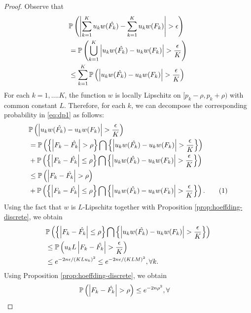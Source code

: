 \begin{proof}
Observe that
\begin{align}
&\mathbb{P}\left( \left| \sum_{k=1}^K u_k w(\hat{F_k}) - \sum_{k=1}^K u_k w(F_k) \right| >\epsilon \right)\nonumber\\
 & = \mathbb{P}\left( 
\bigcup_{k=1}^K \left| u_k w(\hat{F_k}) -u_k w(F_k) \right| > \frac {\epsilon} {K} \right) \nonumber\\ & \leq
    \sum_{k=1}^K \mathbb{P}\left( \left| u_k w(\hat{F_k}) -u_k w(F_k) \right| > \frac {\epsilon} {K} \right)\label{eq:dp1}
\end{align}
For each $k =1,....K$,
the function $w$ is locally Lipschitz on $[{p_k}- \rho, {p_k}+\rho)$ with common constant $L$.
Therefore, for each $k$, we can decompose the corresponding probability in \eqref{eq:dp1} as follows: 
\begin{align*}
& \Prob{\left| u_k w(\hat{F_k}) -u_k w(F_k) \right| > \frac {\epsilon} {K}} \\ 
& = \Prob{ \left\{ \left| F_k -
\hat{F_k} \right| >\rho \right\} \bigcap \left\{ \left| u_k w(\hat{F_k}) -u_k w(F_k) \right|  > \frac
{\epsilon} {K}\right\}}\\
& + \Prob{ \left\{ \left| F_k - \hat{F_k} \right| \leq\rho \right\} \bigcap \left\{ \left| u_k
    w(\hat{F_k}) -u_k w(F_k) \right|  > \frac {\epsilon} {K}\right\}} 
		\\ & \leq \Prob{ \left| F_k - \hat{F_k}
    \right| >\rho} \\
		&+ \Prob{ \left\{ \left| F_k - \hat{F_k} \right| \leq\rho \right\} \bigcap \left\{ \left| u_k
    w(\hat{F_k}) -u_k w(F_k) \right|  > \frac {\epsilon} {K}\right\}}.\stepcounter{equation}\tag{\theequation}\label{eq:hd0}
\end{align*}
Using the fact that $w$ is $L$-Lipschitz together with Proposition \ref{prop:hoeffding-discrete},
we obtain
\begin{align}
& \mathbb{P}\left(  \left\{ \left| F_k - \hat{F_k} \right| \leq\rho \right\} \bigcap \left\{ \left| u_k
    w(\hat{F_k}) -u_k w(F_k) \right|  > \frac {\epsilon} {K}\right\} \right) \nonumber\\ 
		& \leq \mathbb{P}\left( u_k L \left| F_k - \hat{F_k} \right| > \frac
    {\epsilon} {K} \right)\nonumber\\
		&\leq e^ {-2n\epsilon  /(K L u_k)^2} \leq e^ {-2n\epsilon  /(K L M)^2},
     \forall k.\label{eq:hd1}
\end{align}
Using Proposition \ref{prop:hoeffding-discrete}, we obtain
\begin{align}
\Prob{\left| F_k - \hat{F_k} \right| > \rho} & \leq e^{-2n\rho^2},   \forall

\end{align}
\end{proof}
